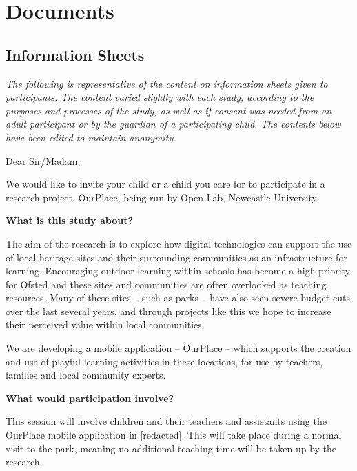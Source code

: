 
\chapter{Documents}

\section{Information Sheets}
\label{app:infoSheets}

\textit{The following is representative of the content on information sheets given to participants. The content varied slightly with each study, according to the purposes and processes of the study, as well as if consent was needed from an adult participant or by the guardian of a participating child. The contents below have been edited to maintain anonymity.}

\vspace{10mm}

Dear Sir/Madam,  

\vspace{5mm}

We would like to invite your child or a child you care for to participate in a research project, OurPlace, being run by Open Lab, Newcastle University. 

\vspace{5mm}

\textbf{What is this study about? }

The aim of the research is to explore how digital technologies can support the use of local heritage sites and their surrounding communities as an infrastructure for learning. Encouraging outdoor learning within schools has become a high priority for Ofsted and these sites and communities are often overlooked as teaching resources. Many of these sites – such as parks – have also seen severe budget cuts over the last several years, and through projects like this we hope to increase their perceived value within local communities. 

We are developing a mobile application – OurPlace – which supports the creation and use of playful learning activities in these locations, for use by teachers, families and local community experts. 

\vspace{5mm}

\textbf{What would participation involve? }

This session will involve children and their teachers and assistants using the OurPlace mobile application in [redacted]. This will take place during a normal visit to the park, meaning no additional teaching time will be taken up by the research. 

